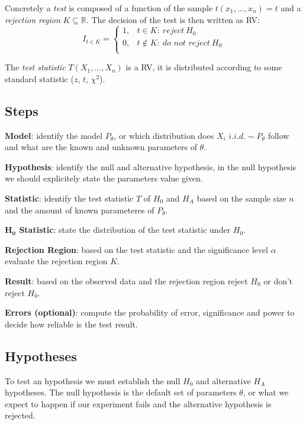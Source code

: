 \documentclass[8pt,a4paper]{extarticle}     %
\newcommand{\R}{\mathbb{R}}
\newcommand{\colnull}{\vfill\null\columnbreak}
\begin{document}
\begin{multicols}{4}
\begin{boxdefinition}[Test] 
	Concretely a \textit{test} is composed of a function of the sample $t(x_1,\dots,x_n)=t$ and a \textit{rejection region} $K\subseteq\R$. The decision of the test is then written as RV: 
	\[
		I_{t\in K} = 
		\begin{cases}
			1, & t\in K: \ \textit{reject} \ H_0 \\
			0, & t\notin K: \ \textit{do not reject} \ H_0 \\ 
		\end{cases}
	\]
\end{boxdefinition}
\begin{boxdefinition} 
	The \textit{test statistic} $T(X_1,\dots,X_n)$ is a RV, it is distributed according to some standard statistic ($z$, $t$, $\chi^2$). 
\end{boxdefinition}
\subsection{Steps}
\begin{listnr}
	\item \textbf{Model}: identify the model $P_\theta$, or which distribution does $X_i$ $i.i.d. \sim P_\theta$ follow and what are the known and unknown parameters of $\theta$. 
	\item \textbf{Hypothesis}: identify the null and alternative hypothesis, in the null hypothesis we should explicitely state the parameters value given. 
	\item \textbf{Statistic}: identify the test statistic $T$ of $H_0$ and $H_A$ based on the sample size $n$ and the amount of known parameteres of $P_\theta$. 
	\item \textbf{$\bm{H_0}$ Statistic}: state the distribution of the test statistic under $H_0$.  
	\item \textbf{Rejection Region}: based on the test statistic and the significance level $\alpha$ evaluate the rejection region $K$. 
	\item \textbf{Result}: based on the observed data and the rejection region reject $H_0$ or don't reject $H_0$. 
	\item \textbf{Errors (optional)}: compute the probability of error, significance and power to decide how reliable is the test result. 
\end{listnr}
\colnull 

\subsection{Hypotheses}
To test an hypothesis we must establish the null $H_0$ and alternative $H_A$ hypotheses. The null hypothesis is the default set of parameters $\theta$, or what we expect to happen if our experiment fails and the alternative hypothesis is rejected. 

\end{multicols}
\end{document}

